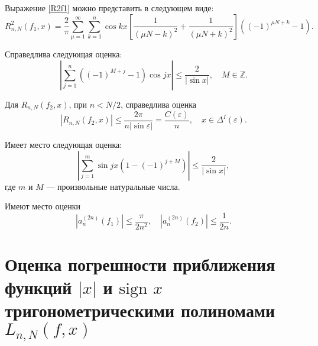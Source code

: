 \begin{lemma}\label{lemma_R2f1_transformation}
	Выражение \eqref{R2f1} можно представить в следующем виде:
	\begin{equation}\label{R_2 with two sums before abel}
		R^2_{n,N}(f_1,x) = \frac{2}{\pi} \sum\limits_{\mu=1}^{\infty} \sum_{k=1}^{n} \cos kx \left[ \frac{1}{(\mu N - k)^2} + \frac{1}{(\mu N + k)^2} \right]
		\left((-1)^{\mu N + k} - 1\right).
	\end{equation}
\end{lemma}

\begin{lemma} \label{lemma sum cos}
	Справедлива следующая оценка:
	\begin{equation*}
		\left|\sum_{j=1}^{n} ((-1)^{M + j} - 1) \cos jx\right| \leq \frac{2}{|\sin x|},\quad M \in \mathbb{Z}.
	\end{equation*}
\end{lemma}

\begin{lemma} \label{th_f2}
	Для $R_{n,N}(f_2,x)$, при $n < N/2$, справедлива оценка
	\begin{equation*} \label{Rf2_est}
		|R_{n,N}(f_2,x)| \leq \frac{2\pi}{n|\sin \varepsilon|} = \frac{C(\varepsilon)}{n}, \quad x \in \Delta^I(\varepsilon).
	\end{equation*}
\end{lemma}

\begin{lemma} \label{lm_sum_sin}
	Имеет место следующая оценка:
	\begin{equation*}
		\left| \sum\limits_{j=1}^{m} \sin j x (1 - (-1)^{j+M}) \right| \leq \frac{2}{|\sin x|},
	\end{equation*}
	где $m$ и $M$ --- произвольные натуральные числа.
\end{lemma}

\begin{lemma} \label{lemma_an_f1_f2}
	Имеют место оценки
	\begin{equation*}
		|a_n^{(2n)}(f_1)| \leq \frac{\pi}{2n^2}, \quad
		|a_n^{(2n)}(f_2)| \leq \frac{1}{2n}.
	\end{equation*}
\end{lemma}



\section{Оценка погрешности приближения функций $|x|$ и $\mbox{sign } x$ тригонометрическими полиномами $L_{n,N}(f,x)$}

